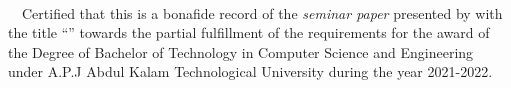 \begin{flushright}
{\myDate}\\ \bigskip                                  
\end{flushright}

\jadafont
  {~~Certified that this  is a bonafide record of the {\em seminar paper} presented by {\bf  \studentName \space \KTUno } with the title ``{{\sc \large  \myTitle }}'' towards the partial fulfillment of the requirements for the award of the Degree of Bachelor of Technology in Computer Science and Engineering under A.P.J Abdul Kalam Technological University during the year 2021-2022.}
  
\vspace*{3cm}

\begin{table}[h]
	\centering
\end{table}

\vspace*{1cm}
\parskip 8pt
\clearpage